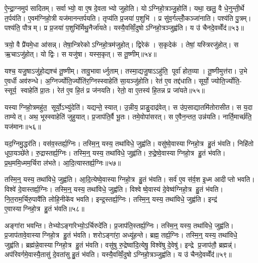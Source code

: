 ऐ॒न्द्रा॒ग्नमुप॑ सादितम्। सर्वाभ्यो॒ वा ए॒ष दे॒वताभ्यो जुहोति। योऽग्निहो॒त्रञ्जु॒होति॑। यथा॒ खलु॒ वै धे॒नुन्ती॒र्थे त॒र्पय॑ति। ए॒वम॑ग्निहो॒त्री यज॑मानन्तर्पयति। तृप्य॑ति प्र॒जया॑ प॒शुभि॑। प्र सु॑व॒र्गल्लोँ॒कञ्जा॑नाति। पश्य॑ति पु॒त्रम्। पश्य॑ति॒ पौत्रम्। प्र प्र॒जया॑ प॒शुभि॑र्मिथु॒नैर्जा॑यते। यस्यै॒वव्विँ॒दुषोऽग्निहो॒त्रञ्जुह्व॑ति। य उ॑ चैनदे॒वव्वेँद॑॥५३॥\anuvakamend[बुभू॑षेद्ध्रि॒यमा॑णञ्जायते॒ द्वे च॑]

त्रयो॒ वै प्रै॑यमे॒धा आ॑सन्न्। तेषा॒न्त्रिरेकोऽग्निहो॒त्रम॑जुहोत्। द्विरेक॑। स॒कृदेक॑। तेषां॒ यस्त्रिरजु॑होत्। स ऋ॒चाऽजु॑होत्। यो द्विः। स यजु॑षा। यस्स॒कृत्। स तू॒ष्णीम्॥५४॥

यश्च॒ यजु॒षाऽजु॑हो॒द्यश्च॑ तू॒ष्णीम्। तावु॒भावार्ध्नुताम्। तस्मा॒द्यजु॒षाऽऽहु॑ति॒ पूर्वा॑ होत॒व्या। तू॒ष्णीमुत्त॑रा। उ॒भे ए॒वर्धी अव॑रुन्धे। अ॒ग्निर्ज्योति॒र्ज्योति॑र॒ग्निस्स्वाहेति॑ सा॒यञ्जु॑होति। रेत॑ ए॒व तद्द॑धाति। सूर्यो॒ ज्योति॒र्ज्योति॒- स्सूर्य॒ स्वाहेति॑ प्रा॒तः। रेत॑ ए॒व हि॒तं प्र ज॑नयति। रेतो॒ वा ए॒तस्य॑ हि॒तन्न प्र जा॑यते॥५५॥

यस्याग्निहो॒त्रमहु॑त॒ सूर्यो॒ऽभ्यु॑देति॑। यद्यन्ते॒ स्यात्। उ॒न्नीय॒ प्राङु॒दाद्र॑वेत्। स उ॑प॒साद्यातमि॑तोरासीत। स य॒दा ताम्येत्। अथ॒ भूस्स्वाहेति॑ जुहुयात्। प्र॒जाप॑ति॒र्वै भू॒तः। तमे॒वोपा॑सरत्। स ए॒वैन॒न्तत॒ उन्न॑यति। नार्ति॒मार्च्छ॑ति॒ यज॑मानः॥५६॥\anuvakamend[तू॒ष्णीञ्जा॑यते॒ यज॑मानः]

यद॒ग्निमु॒द्धर॑ति। वस॑व॒स्तर्ह्य॒ग्निः। तस्मि॒न्॒ यस्य॒ तथा॑विधे॒ जुह्व॑ति। वसु॑ष्वे॒वास्याग्निहो॒त्र हु॒तं भ॑वति। निहि॑तो धूपा॒यञ्छे॑ते। रु॒द्रास्तर्ह्य॒ग्निः। तस्मि॒न्॒ यस्य॒ तथा॑विधे॒ जुह्व॑ति। रु॒द्रे॒ष्वे॒वास्याग्निहो॒त्र हु॒तं भ॑वति। प्र॒थ॒ममि॒ध्मम॒र्चिरा ल॑भते। आ॒दि॒त्यास्तर्ह्य॒ग्निः॥५७॥

तस्मि॒न्॒ यस्य॒ तथा॑विधे॒ जुह्व॑ति। आ॒दि॒त्येष्वे॒वास्याग्निहो॒त्र हु॒तं भ॑वति। सर्व॑ ए॒व स॑र्व॒श इ॒ध्म आदीप्तो भवति। विश्वे॑ दे॒वास्तर्ह्य॒ग्निः। तस्मि॒न्॒ यस्य॒ तथा॑विधे॒ जुह्व॑ति। विश्वेष्वे॒वास्य॑ दे॒वेष्व॑ग्निहो॒त्र हु॒तं भ॑वति। नि॒त॒राम॒र्चिरु॒पावै॑ति लोहि॒नीके॑व भवति। इन्द्र॒स्तर्ह्य॒ग्निः। तस्मि॒न्॒ यस्य॒ तथा॑विधे॒ जुह्व॑ति। इन्द्र॑ ए॒वास्याग्निहो॒त्र हु॒तं भ॑वति॥५८॥

अङ्गा॑रा भवन्ति। तेभ्योऽङ्गा॑रेभ्यो॒ऽर्चिरुदे॑ति। प्र॒जाप॑ति॒स्तर्ह्य॒ग्निः। तस्मि॒न्॒ यस्य॒ तथा॑विधे॒ जुह्व॑ति। प्र॒जाप॑तावे॒वास्याग्निहो॒त्र हु॒तं भ॑वति। शरोऽङ्गा॑रा॒ अध्यू॑हन्ते। ब्रह्म॒ तर्ह्य॒ग्निः। तस्मि॒न्॒ यस्य॒ तथा॑विधे॒ जुह्व॑ति। ब्रह्म॑न्ने॒वास्याग्निहो॒त्र हु॒तं भ॑वति। वसु॑षु रु॒द्रेष्वा॑दि॒त्येषु॒ विश्वे॑षु दे॒वेषु॑। इन्द्रे प्र॒जाप॑तौ॒ ब्रह्मन्न्॑। अप॑रिवर्गमे॒वास्यै॒तासु॑ दे॒वता॑सु हु॒तं भ॑वति। यस्यै॒वव्विँ॒दुषोऽग्निहो॒त्रञ्जुह्व॑ति। य उ॑ चैनदे॒वव्वेँद॑॥५९॥\anuvakamend[आ॒दि॒त्यास्तर्ह्य॒ग्निरिन्द्र॑ ए॒वास्याग्निहो॒त्र हु॒तं भ॑वति दे॒वेषु॑ च॒त्वारि॑ च (यद॒ग्निन्निहि॑तः प्रथ॒म सर्व॑ ए॒व नि॑त॒रामङ्गा॑रा॒श्शरोऽङ्गा॑रा॒ ब्रह्म॒ वसु॑ष्व॒ष्टौ ॥ )]

